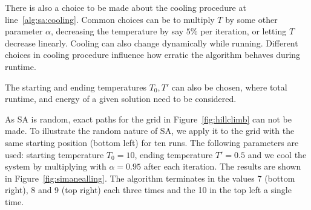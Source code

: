 \hfill

There is also a choice to be made about the cooling procedure at line~\ref{alg:sa:cooling}. Common choices can be to multiply $T$ by some other parameter $\alpha$, decreasing the temperature by say $5\%$ per iteration, or letting $T$ decrease linearly. Cooling can also change dynamically while running. Different choices in cooling procedure influence how erratic the algorithm behaves during runtime.

The starting and ending temperatures $T_0, T'$ can also be chosen, where total runtime, and energy of a given solution need to be considered.

As SA is random, exact paths for the grid in Figure~\ref{fig:hillclimb} can not be made. To illustrate the random nature of SA, we apply it to the grid with the same starting position (bottom left) for ten runs. The following parameters are used: starting temperature $T_0 = 10$, ending temperature $T' = 0.5$ and we cool the system by multiplying with $\alpha = 0.95$ after each iteration. The results are shown in Figure~\ref{fig:simanealling}. The algorithm terminates in the values 7 (bottom right), 8 and 9 (top right) each three times and the 10 in the top left a single time.

